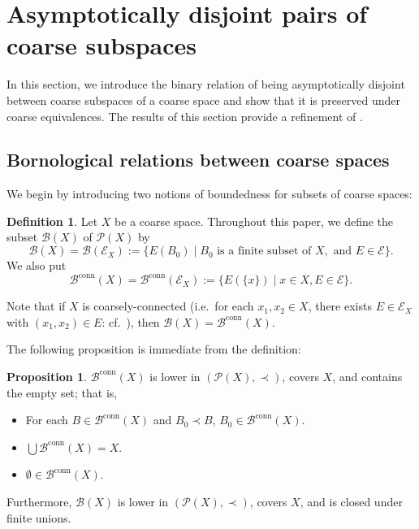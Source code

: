\documentclass[12pt, a4paper]{amsart}
\theoremstyle{definition}
\newtheorem{proposition}[theorem]{Proposition}
\newtheorem{definition}[theorem]{Definition}
\begin{document}
\section{Asymptotically disjoint pairs of coarse subspaces}\label{section:asymptoticallydisjoint}

In this section, we introduce the binary relation of being asymptotically disjoint between coarse subspaces of a coarse space and show that it is preserved under coarse equivalences. The results of this section provide a refinement of \cite[Section 4]{NagayaOgawaOkuda2025}.

\subsection{Bornological relations between coarse spaces}

We begin by introducing two notions of boundedness for subsets of coarse spaces:

\begin{definition}
Let $X$ be a coarse space. Throughout this paper, we define the subset $\mathcal{B}(X)$ of $\mathcal{P}(X)$ by
\[
\mathcal{B}(X) = \mathcal{B}(\mathcal{E}_X) := \{ E(B_0) \mid B_0 \text{ is a finite subset of } X, \text{ and } E \in \mathcal{E} \}.
\]
We also put
\[
\mathcal{B}^{\mathrm{conn}}(X) = \mathcal{B}^{\mathrm{conn}}(\mathcal{E}_X) := \{ E(\{ x \}) \mid x \in X, E \in \mathcal{E} \}.
\]
\end{definition}

Note that if $X$ is coarsely-connected (i.e.~for each $x_1,x_2 \in X$, there exists $E \in \mathcal{E}_X$ with $(x_1,x_2) \in E$: cf.~\cite[Definition 2.11]{Roe2003LectureCoarse}), 
then $\mathcal{B}(X) = \mathcal{B}^{\mathrm{conn}}(X)$.

The following proposition is immediate from the definition:

\begin{proposition}\label{propostion:stdborstr}
$\mathcal{B}^{\mathrm{conn}}(X)$ is lower in $(\mathcal{P}(X),\prec)$, covers $X$, and contains the empty set; that is,
\begin{itemize}
    \item For each $B \in \mathcal{B}^{\mathrm{conn}}(X)$ and $B_0 \prec B$, $B_0 \in \mathcal{B}^{\mathrm{conn}}(X)$. 
    \item $\bigcup \mathcal{B}^{\mathrm{conn}}(X) = X$.
    \item $\emptyset \in \mathcal{B}^{\mathrm{conn}}(X)$.
\end{itemize}
Furthermore, $\mathcal{B}(X)$ is lower in $(\mathcal{P}(X),\prec)$, covers $X$, and is closed under finite unions.
\end{proposition}
\end{document}
